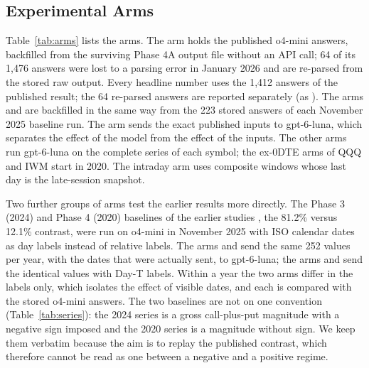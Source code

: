 \subsection{Experimental Arms}
\label{sec:methods:arms}

Table~\ref{tab:arms} lists the arms. The arm  holds the published o4-mini answers, backfilled from the surviving Phase 4A output file without an API call; 64 of its 1{,}476 answers were lost to a parsing error in January 2026 and are re-parsed from the stored raw output. Every headline number uses the 1{,}412 answers of the published result; the 64 re-parsed answers are reported separately (as ). The arms  and  are backfilled in the same way from the 223 stored answers of each November 2025 baseline run. The arm  sends the exact published inputs to gpt-6-luna, which separates the effect of the model from the effect of the inputs. The other arms run gpt-6-luna on the complete series of each symbol; the ex-0DTE arms of QQQ and IWM start in 2020. The intraday arm uses composite windows whose last day is the late-session snapshot.

Two further groups of arms test the earlier results more directly. The Phase 3 (2024) and Phase 4 (2020) baselines of the earlier studies \cite{regan2026regimes,regan2026jrfm}, the 81.2\% versus 12.1\% contrast, were run on o4-mini in November 2025 with ISO calendar dates as day labels instead of relative labels. The arms  and  send the same 252 values per year, with the dates that were actually sent, to gpt-6-luna; the arms  and  send the identical values with Day-T labels. Within a year the two arms differ in the labels only, which isolates the effect of visible dates, and each is compared with the stored o4-mini answers. The two baselines are not on one convention (Table~\ref{tab:series}): the 2024 series is a gross call-plus-put magnitude with a negative sign imposed and the 2020 series is a magnitude without sign. We keep them verbatim because the aim is to replay the published contrast, which therefore cannot be read as one between a negative and a positive regime.

